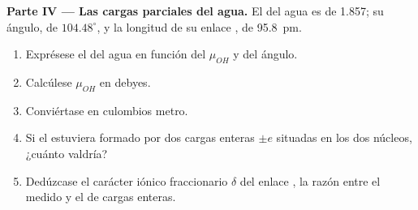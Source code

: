 \begin{problem}
\medskip
\noindent\textbf{Parte IV --- Las cargas parciales del agua.}
El  del agua es de \qty{1.857}{\debye}; su ángulo, de
$104.48^\circ$, y la longitud de su enlace , de \qty{95.8}{pm}.
\begin{enumerate}[resume]
  \item Exprésese el  del agua en función del  $\mu_{OH}$ y del ángulo.
  \item Calcúlese $\mu_{OH}$ en debyes.
  \item Conviértase en culombios metro.
  \item Si el  estuviera formado por dos cargas enteras
        $\pm e$ situadas en los dos núcleos, ¿cuánto valdría?
  \item Dedúzcase el carácter iónico fraccionario $\delta$ del enlace
        , la razón entre el  medido y el de cargas
        enteras.
\end{enumerate}
\end{problem}
